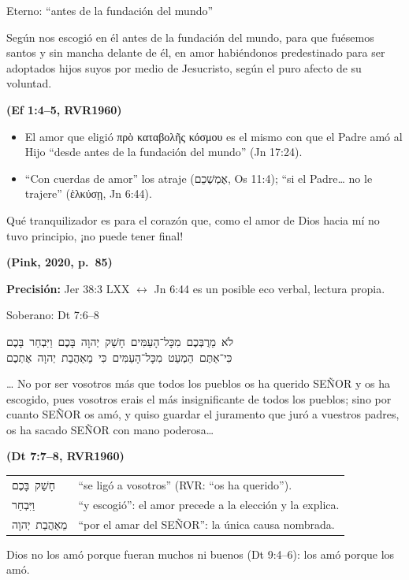 \documentclass[hyperref={bookmarks=false},aspectratio=169]{beamer}
\newcommand{\heb}[1]{\mbox{\foreignlanguage{hebrew}{#1}}}
\newcommand{\grc}[1]{\foreignlanguage{ancientgreek}{#1}}
\newcommand{\SENOR}{S{\fontsize{0.78em}{1em}\selectfont EÑOR}}
\newcommand{\fuente}[1]{\par\hfill{\upshape\bfseries\footnotesize\textcolor{azul}{#1}}}
\newcommand{\precision}[1]{{\footnotesize\color{gris}\textbf{Precisión:} #1}}
\begin{document}
\begin{frame}{Eterno: ``antes de la fundación del mundo''}
\begin{cita}Según nos escogió en él antes de la fundación del mundo, para que fuésemos santos y sin mancha delante de él, en amor habiéndonos predestinado para ser adoptados hijos suyos por medio de Jesucristo, según el puro afecto de su voluntad.\fuente{(Ef 1:4--5, RVR1960)}\end{cita}
\small\begin{itemize}
\item El amor que eligió \grc{πρὸ καταβολῆς κόσμου} es el mismo con que el Padre amó al Hijo ``desde antes de la fundación del mundo'' (Jn 17:24).
\item ``Con cuerdas de amor'' los atraje (\heb{אֶמְשְׁכֵם}, Os 11:4); ``si el Padre\ldots{} no le trajere'' (\grc{ἑλκύσῃ}, Jn 6:44).
\end{itemize}
\begin{cita}Qué tranquilizador es para el corazón que, como el amor de Dios hacia mí no tuvo principio, ¡no puede tener final!\fuente{(Pink, 2020, p.~85)}\end{cita}
\precision{Jer 38:3 LXX $\leftrightarrow$ Jn 6:44 es un posible eco verbal, lectura propia.}
\end{frame}

\begin{frame}{Soberano: Dt 7:6--8}
\begin{center}\heb{לֹא מֵרֻבְּכֶם מִכָּל־הָעַמִּים חָשַׁק יְהוָה בָּכֶם וַיִּבְחַר בָּכֶם}\\[1pt]\heb{כִּי־אַתֶּם הַמְעַט מִכָּל־הָעַמִּים כִּי מֵאַהֲבַת יְהוָה אֶתְכֶם}\end{center}
\begin{cita}\ldots{} No por ser vosotros más que todos los pueblos os ha querido \SENOR{} y os ha escogido, pues vosotros erais el más insignificante de todos los pueblos; sino por cuanto \SENOR{} os amó, y quiso guardar el juramento que juró a vuestros padres, os ha sacado \SENOR{} con mano poderosa\ldots\fuente{(Dt 7:7--8, RVR1960)}\end{cita}
\renewcommand{\arraystretch}{1.05}\scriptsize
\begin{tabular}{@{}>{\RaggedRight\arraybackslash}p{2.6cm}>{\RaggedRight\arraybackslash}p{9.3cm}@{}}
\heb{חָשַׁק בָּכֶם} & ``se ligó a vosotros'' (RVR: ``os ha querido''). \\
\heb{וַיִּבְחַר} & ``y escogió'': el amor precede a la elección y la explica. \\
\heb{מֵאַהֲבַת יְהוָה} & ``por el amar del \SENOR'': la única causa nombrada. \\
\end{tabular}\par\smallskip
\small Dios no los amó porque fueran muchos ni buenos (Dt 9:4--6): los amó porque los amó.
\end{frame}
\end{document}
